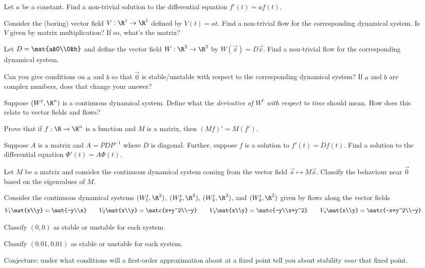 	\question
	\begin{parts}
		\item Let $a$ be a constant. Find a non-trivial solution to the differential equation $f'(t)=af(t)$.
		\item Consider the (boring) vector field $V:\R^1\to\R^1$ defined by $V(t)=at$. Find a non-trivial flow
			for the corresponding dynamical system. Is $V$ given by matrix multiplication? If so, what's the matrix?
		\item Let $D=\mat{a&0\\0&b}$ and define the vector field $W:\R^2\to\R^2$ by $W(\vec x)=D\vec x$. Find a non-trivial
			flow for the corresponding dynamical system.

			Can you give conditions on $a$ and $b$ so that $\vec 0$ is stable/unstable with respect to the corresponding
			dynamical system? If $a$ and $b$ are complex numbers, does that change your answer?
		\item Suppose $(W^t,\R^n)$ is a continuous dynamical system. Define what the \emph{derivative of $W^t$ with respect to
			time} should mean. How does this relate to vector fields and flows?
		\item Prove that if $f:\R\to\R^n$ is a function and $M$ is a matrix, then $(Mf)'=M(f')$.
		\item Suppose $A$ is a matrix and $A=PDP^{-1}$ where $D$ is diagonal. Further,
			suppose $f$ is a solution to $f'(t)=Df(t)$. Find a solution to the differential equation
			$\Phi'(t)=A\Phi(t)$.
		\item Let $M$ be a matrix and consider the continuous dynamical system coming from the vector field $\vec x\mapsto M\vec x$.
			Classify the behaviour near $\vec 0$ based on the eigenvalues of $M$.
	\end{parts}

	\question
	\label{QCTS}
	Consider the continuous dynamical systems $(W^t_1,\R^2)$, $(W^t_2,\R^2)$, $(W^t_3,\R^2)$, and $(W^t_4,\R^2)$
	given by flows along the vector fields
	\[
		V_1\mat{x\\y}=\mat{-y\\x}\qquad
		V_2\mat{x\\y}=\matc{x+y^2\\-y}\qquad
		V_3\mat{x\\y}=\matc{-y\\x+y^2}\qquad
		V_4\mat{x\\y}=\matc{-x+y^2\\-y}
	\]
	\begin{parts}
		\item Classify $(0,0)$ as stable or unstable for each system.
		\item Classify $(0.01,0.01)$ as stable or unstable for each system.
		\item Conjecture: under what conditions will a first-order approximation about at a
			fixed point tell you about stability \emph{near} that fixed point.
			\label{QCTS:b}
	\end{parts}

